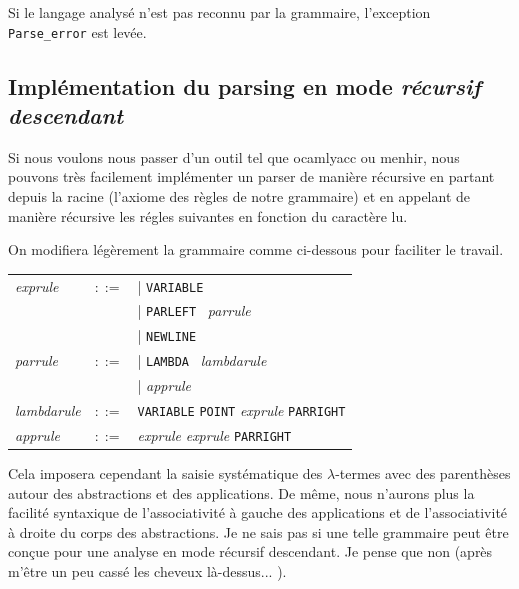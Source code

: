 \documentclass[11pt]{book}
\begin{document}
 Si le langage analysé n'est pas reconnu par la grammaire, l'exception \verb+Parse_error+ est levée.
 \subsection{Implémentation du parsing en mode \textit{récursif descendant}}
 
 Si nous voulons nous passer d'un outil tel que ocamlyacc ou menhir, nous pouvons très facilement implémenter un parser
 de manière récursive en partant depuis la racine (l'axiome des règles de notre grammaire) et en appelant de manière récursive les
 régles suivantes en fonction du caractère lu.
 
 On modifiera légèrement la grammaire comme ci-dessous pour faciliter le travail.
 
 
\vspace{0.5cm}
\begin{tabular}{lll}
\textit{exprule} & $::=$ & | \verb+VARIABLE+  \\
					  &	    & | \verb+PARLEFT+ \  \textit{parrule} \\
					  & 		 & | \verb+NEWLINE+ \\
\textit{parrule} & $::=$ & | \verb+LAMBDA+ \ \textit{lambdarule}  \\
					  &       & | \textit{apprule} \\ 
\textit{lambdarule} & $::=$ & \verb+VARIABLE+  \verb+POINT+  \textit{exprule}  \verb+PARRIGHT+ \\
\textit{apprule} & $::=$    &  \textit{exprule} \textit{exprule}  \verb+PARRIGHT+ \\
\end{tabular}
\vspace{0.5cm}

Cela imposera cependant la saisie systématique des $\lambda$-termes avec des parenthèses autour des abstractions et des applications.
De même, nous n'aurons plus la facilité syntaxique de l'associativité à gauche des applications et de l'associativité à droite
du corps des abstractions.
Je ne sais pas si une telle grammaire peut être conçue pour une analyse en mode
récursif descendant.
Je pense que non (après m'être un peu cassé les cheveux là-dessus... ). 
\end{document}
